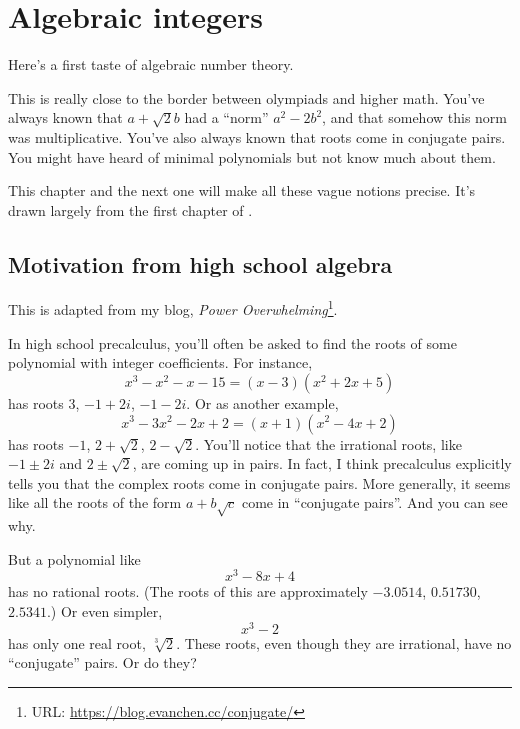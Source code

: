 \chapter{Algebraic integers}
\label{ch:algebraic_integers}
Here's a first taste of algebraic number theory.

This is really close to the border between olympiads and higher math.
You've always known that $a+\sqrt2 b$ had a ``norm'' $a^2-2b^2$,
and that somehow this norm was multiplicative.
You've also always known that roots come in conjugate pairs.
You might have heard of minimal polynomials but not know much about them.

This chapter and the next one will make all these vague notions precise.
It's drawn largely from the first chapter of \cite{ref:oggier_NT}.

\section{Motivation from high school algebra}
This is adapted from my blog, \emph{Power Overwhelming}\footnote{URL:
\url{https://blog.evanchen.cc/conjugate/}}.

In high school precalculus, you'll often be asked to find the roots of some polynomial with integer coefficients.
For instance,
\[ x^3 - x^2 - x - 15 = (x-3)(x^2+2x+5) \]
has roots $3$, $-1+2i$, $-1-2i$.
Or as another example,
\[ x^3 - 3x^2 - 2x + 2 = (x+1)(x^2-4x+2) \]
has roots $-1$, $2 + \sqrt 2$, $2 - \sqrt 2$.
You'll notice that the irrational roots, like $-1 \pm 2i$ and $2 \pm \sqrt 2$, are coming up in pairs. In fact, I think precalculus explicitly tells you that the complex roots come in conjugate pairs. More generally, it seems like all the roots of the form $a + b \sqrt c$ come in ``conjugate pairs''. And you can see why.

But a polynomial like
\[ x^3 - 8x + 4 \]
has no rational roots.
(The roots of this are approximately $-3.0514$, $0.51730$, $2.5341$.)
Or even simpler,
\[ x^3 - 2 \]
has only one real root, $\sqrt[3]{2}$.
These roots, even though they are irrational, have no ``conjugate'' pairs.
Or do they?

